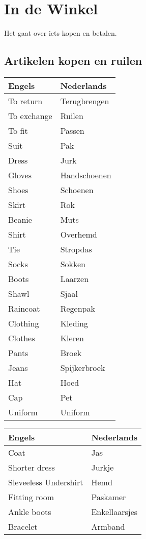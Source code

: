 \documentclass[a4paper,14pt]{extarticle}
\begin{document}
\section{In de Winkel}
Het gaat over iets kopen en betalen. 
\subsection{Artikelen kopen en ruilen}
\begin{paracol}{2}
\begin{tabularx}{200pt}{ p{100pt} p{100pt} }
 \hline
 Engels & Nederlands \\
 \hline
 To return & Terugbrengen \\
 To exchange & Ruilen \\
 To fit & Passen \\
 Suit & Pak \\
 Dress & Jurk \\
 Gloves & Handschoenen \\
 Shoes & Schoenen \\
 Skirt & Rok \\
 Beanie & Muts \\
 Shirt & Overhemd \\
 Tie & Stropdas \\
 Socks & Sokken \\
 Boots & Laarzen \\
 Shawl & Sjaal \\
 Raincoat & Regenpak \\
 Clothing & Kleding \\
 Clothes & Kleren \\
 Pants & Broek \\
 Jeans & Spijkerbroek \\
 Hat & Hoed \\
 Cap & Pet \\
 Uniform & Uniform \\
\end{tabularx}
    \switchcolumn
\begin{tabularx}{200pt}{ p{100pt} p{100pt} }
 \hline
 Engels & Nederlands \\
 \hline
 Coat & Jas \\
 Shorter dress & Jurkje \\
 Sleveeless Undershirt & Hemd \\
 Fitting room & Paskamer \\
 Ankle boots & Enkellaarsjes \\
 Bracelet & Armband \\

\end{tabularx}
\end{paracol}
\end{document}

